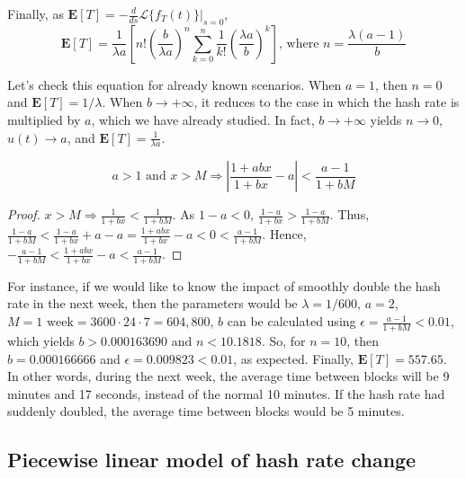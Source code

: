 Finally, as $\mathbf{E}[T] = - \frac{d}{ds} \mathcal{L}\{f_T(t)\}|_{s=0}$,
$$\mathbf{E}[T] = \frac{1}{\lambda a} \left[ n! \left(\frac{b}{\lambda a}\right)^n \sum_{k=0}^n \frac{1}{k!} \left( \frac{\lambda a}{b} \right)^{k} \right] \text{, where $n = \frac{\lambda(a-1)}{b}$}$$

Let's check this equation for already known scenarios. When $a=1$, then $n=0$ and $\mathbf{E}[T] = 1/\lambda$. When $b \rightarrow +\infty$, it reduces to the case in which the hash rate is multiplied by $a$, which we have already studied. In fact, $b \rightarrow +\infty$ yields $n \rightarrow 0$, $u(t) \rightarrow a$, and $\mathbf{E}[T] = \frac{1}{\lambda a}$.

\begin{theorem}
	$$a > 1 \text{ and } x > M \Rightarrow \left| \frac{1+abx}{1+bx} - a \right| < \frac{a-1}{1+bM}$$
\end{theorem}
\begin{proof}
$x > M \Rightarrow \frac{1}{1+bx} < \frac{1}{1+bM}$. As $1-a<0$, $\frac{1-a}{1+bx} > \frac{1-a}{1+bM}$. Thus, $\frac{1-a}{1+bM} < \frac{1-a}{1+bx} + a - a = \frac{1+abx}{1+bx} - a < 0 < \frac{a-1}{1+bM}$. Hence, $-\frac{a-1}{1+bM} < \frac{1+abx}{1+bx} - a < \frac{a-1}{1+bM}$.
\end{proof}

For instance, if we would like to know the impact of smoothly double the hash rate in the next week, then the parameters would be $\lambda = 1/600$, $a=2$, $M=1\text{ week}=3600\cdot24\cdot7 = 604,800$, $b$ can be calculated using $\epsilon = \frac{a-1}{1+bM} < 0.01$, which yields $b > 0.000163690$ and $n < 10.1818$. So, for $n=10$, then $b=0.000166666$ and $\epsilon = 0.009823 < 0.01$, as expected. Finally, $\mathbf{E}[T] = 557.65$. In other words, during the next week, the average time between blocks will be 9 minutes and 17 seconds, instead of the normal 10 minutes. If the hash rate had suddenly doubled, the average time between blocks would be 5 minutes.





\subsection{Piecewise linear model of hash rate change}

